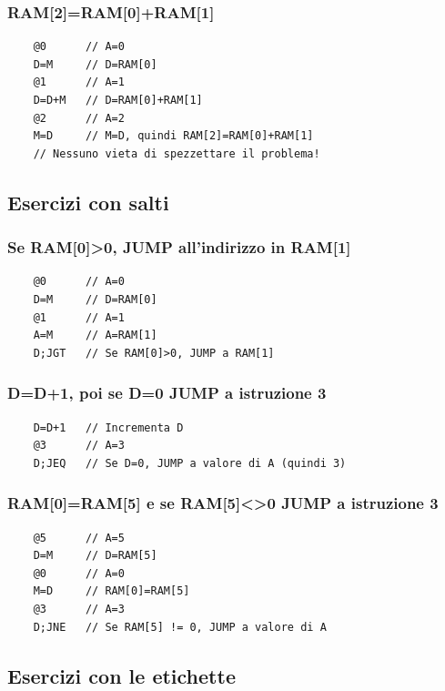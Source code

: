 \documentclass[12pt]{article}
\begin{document}
\subsubsection{RAM[2]=RAM[0]+RAM[1]}
\begin{lstlisting}
    @0      // A=0
    D=M     // D=RAM[0]
    @1      // A=1
    D=D+M   // D=RAM[0]+RAM[1]
    @2      // A=2
    M=D     // M=D, quindi RAM[2]=RAM[0]+RAM[1]
    // Nessuno vieta di spezzettare il problema!
\end{lstlisting}

\subsection{Esercizi con salti}

\subsubsection{Se RAM[0]\textgreater 0, JUMP all'indirizzo in RAM[1]}
\begin{lstlisting}
    @0      // A=0
    D=M     // D=RAM[0]
    @1      // A=1
    A=M     // A=RAM[1]
    D;JGT   // Se RAM[0]>0, JUMP a RAM[1]
\end{lstlisting}

\subsubsection{D=D+1, poi se D=0 JUMP a istruzione 3}
\begin{lstlisting}
    D=D+1   // Incrementa D
    @3      // A=3
    D;JEQ   // Se D=0, JUMP a valore di A (quindi 3)
\end{lstlisting}

\pagebreak
\subsubsection{RAM[0]=RAM[5] e se RAM[5]\textless\textgreater 0 JUMP a istruzione 3}
\begin{lstlisting}
    @5      // A=5
    D=M     // D=RAM[5]
    @0      // A=0
    M=D     // RAM[0]=RAM[5]
    @3      // A=3
    D;JNE   // Se RAM[5] != 0, JUMP a valore di A
\end{lstlisting}

\subsection{Esercizi con le etichette}
\end{document}
